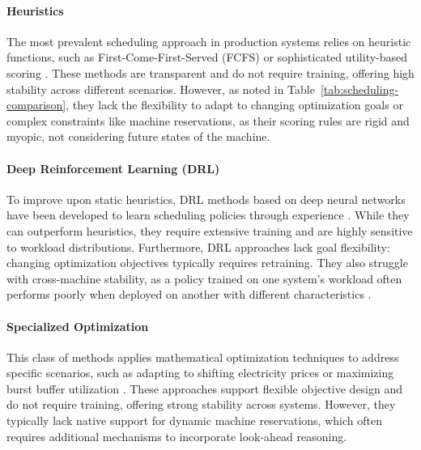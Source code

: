 \documentclass[conference]{IEEEtran}
\begin{document}
\paragraph{Heuristics}
The most prevalent scheduling approach in production systems relies on heuristic functions, such as First-Come-First-Served (FCFS) or sophisticated utility-based scoring \cite{backfill,allcock_expatanl_2018, tang-cluster09,alcfAuroraRunningJobs,nerscQueuesChargesPolicy}. These methods are transparent and do not require training, offering high stability across different scenarios. However, as noted in Table~\ref{tab:scheduling-comparison}, they lack the flexibility to adapt to changing optimization goals or complex constraints like machine reservations, as their scoring rules are rigid and myopic, not considering future states of the machine.

\paragraph{Deep Reinforcement Learning (DRL)} 
To improve upon static heuristics, DRL methods based on deep neural networks have been developed to learn scheduling policies through experience \cite{fan_deep_2021, zhang_rlscheduler_2020}. While they can outperform heuristics, they require extensive training and are highly sensitive to workload distributions. Furthermore, DRL approaches lack goal flexibility: changing optimization objectives typically requires retraining. They also struggle with cross-machine stability, as a policy trained on one system's workload often performs poorly when deployed on another with different characteristics \cite{zhang_rlscheduler_2020}.

\paragraph{Specialized Optimization}
This class of methods applies mathematical optimization techniques to address specific scenarios, such as adapting to shifting electricity prices \cite{yang-sc13} or maximizing burst buffer utilization \cite{fan_scheduling_2019}. These approaches support flexible objective design and do not require training, offering strong stability across systems.  However, they typically lack native support for dynamic machine reservations, which often requires additional mechanisms to incorporate look-ahead reasoning.
\end{document}
